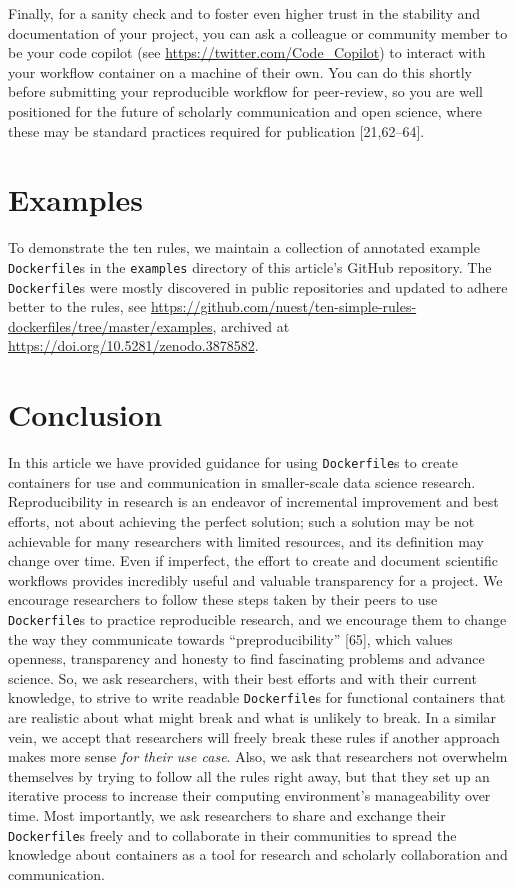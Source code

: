 \documentclass[10pt,letterpaper]{article}
\begin{document}
Finally, for a sanity check and to foster even higher trust in the
stability and documentation of your project, you can ask a colleague or
community member to be your code copilot (see
\url{https://twitter.com/Code_Copilot}) to interact with your workflow
container on a machine of their own. You can do this shortly before
submitting your reproducible workflow for peer-review, so you are well
positioned for the future of scholarly communication and open science,
where these may be standard practices required for publication
{[}21,62--64{]}.

\hypertarget{examples}{%
\section{Examples}\label{examples}}

To demonstrate the ten rules, we maintain a collection of annotated
example \texttt{Dockerfile}s in the \texttt{examples} directory of this
article's GitHub repository. The \texttt{Dockerfile}s were mostly
discovered in public repositories and updated to adhere better to the
rules, see
\url{https://github.com/nuest/ten-simple-rules-dockerfiles/tree/master/examples},
archived at \url{https://doi.org/10.5281/zenodo.3878582}.

\hypertarget{conclusion}{%
\section*{Conclusion}\label{conclusion}}

In this article we have provided guidance for using \texttt{Dockerfile}s
to create containers for use and communication in smaller-scale data
science research. Reproducibility in research is an endeavor of
incremental improvement and best efforts, not about achieving the
perfect solution; such a solution may be not achievable for many
researchers with limited resources, and its definition may change over
time. Even if imperfect, the effort to create and document scientific
workflows provides incredibly useful and valuable transparency for a
project. We encourage researchers to follow these steps taken by their
peers to use \texttt{Dockerfile}s to practice reproducible research, and
we encourage them to change the way they communicate towards
``preproducibility'' {[}65{]}, which values openness, transparency and
honesty to find fascinating problems and advance science. So, we ask
researchers, with their best efforts and with their current knowledge,
to strive to write readable \texttt{Dockerfile}s for functional
containers that are realistic about what might break and what is
unlikely to break. In a similar vein, we accept that researchers will
freely break these rules if another approach makes more sense \emph{for
their use case}. Also, we ask that researchers not overwhelm themselves
by trying to follow all the rules right away, but that they set up an
iterative process to increase their computing environment's
manageability over time. Most importantly, we ask researchers to share
and exchange their \texttt{Dockerfile}s freely and to collaborate in
their communities to spread the knowledge about containers as a tool for
research and scholarly collaboration and communication.
\end{document}
